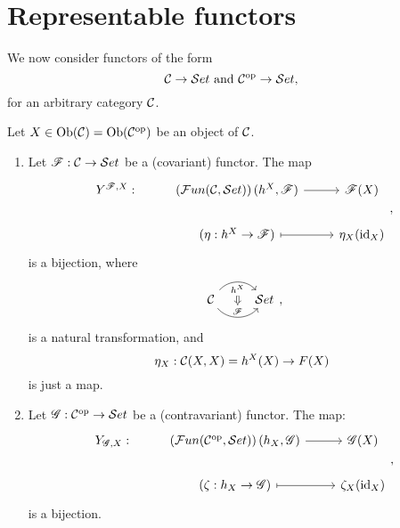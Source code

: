 \section{Representable functors}
We now consider functors of the form
\[
\mathcal{C} \to \mathcal{S}et\text{ and }\mathcal{C}^{\mathrm{op}}\to \mathcal{S}et,
\]
for an arbitrary category $\mathcal{C}$.
\begin{lem}\label{6:yonneda}
  Let $X\in \text{Ob}(\mathcal{C}) = \text{Ob}(\mathcal{C}^{\mathrm{op}})$ be an object of $\mathcal{C}$.
  \begin{enumerate}
    \item Let $\mathscr{F}: \mathcal{C} \to \mathcal{S}et$ be a (covariant) functor. The map
    \[
      \begin{tikzcd}Y^{\ffunc,X}:&\left(\fnc(\ccat,\stc)\right)(h^X,\ffunc)\ar{r}&\ffunc(X)\\
      &(\eta:h^X\to \ffunc)\ar[mapsto]{r}&\eta_X(\id_X)\end{tikzcd},
  \]
  is a bijection,
  where
  \[
  \begin{tikzcd}
  \ccat \arrow[r, bend left=50, "h^X"{name=U, below}]
  \arrow[r, bend right=50, "\ffunc"{name=D}]
  &\stc
  \arrow[Rightarrow, from=U, to=D] \end{tikzcd},
  \]
  is a natural transformation, and
  \[
  \eta_X: \mathcal{C}(X,X)=h^X(X)\to F(X)
\]
  is just a map.
  \item Let $\mathscr{G}:\mathcal{C}^{\mathrm{op}}\to \mathcal{S}et$ be a (contravariant) functor. The map:
  \[
    \begin{tikzcd}Y_{\gfunc,X}:&\left(\fnc(\op{\ccat},\stc)\right)(h_X,\gfunc)\ar{r}&\gfunc(X)\\
    &(\zeta:h_X\to \gfunc)\ar[mapsto]{r}&\zeta_X(\id_X)\end{tikzcd},
\]
  is a bijection.
\end{enumerate}
\end{lem}
